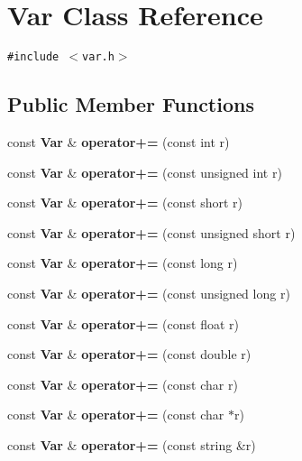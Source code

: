 \section{Var Class Reference}
\label{classVar}
{\tt \#include $<$var.h$>$}

\subsection*{Public Member Functions}
\begin{CompactItemize}
\item 
const {\bf Var} \& \textbf{operator+=} (const int r)\label{classVar_4bb1b12f7b8431c7d36e74216c9d0717}

\item 
const {\bf Var} \& \textbf{operator+=} (const unsigned int r)\label{classVar_12b078f76009965c5d5c80ca806983ef}

\item 
const {\bf Var} \& \textbf{operator+=} (const short r)\label{classVar_31d73e7f641896e16d57e3ef01cd3ea4}

\item 
const {\bf Var} \& \textbf{operator+=} (const unsigned short r)\label{classVar_581eef061e50fe7f0f648b8de5fcb699}

\item 
const {\bf Var} \& \textbf{operator+=} (const long r)\label{classVar_95be0effe332f9e713d59e8bbc604958}

\item 
const {\bf Var} \& \textbf{operator+=} (const unsigned long r)\label{classVar_7862de46a2c0bef16f71bb3e82bf6692}

\item 
const {\bf Var} \& \textbf{operator+=} (const float r)\label{classVar_0035f89e37efb4ae17c12453e44b81b2}

\item 
const {\bf Var} \& \textbf{operator+=} (const double r)\label{classVar_7de3db4816bdd14810b6426504a66c07}

\item 
const {\bf Var} \& \textbf{operator+=} (const char r)\label{classVar_03b89deb763b3c76afa6457ecae5d14b}

\item 
const {\bf Var} \& \textbf{operator+=} (const char $\ast$r)\label{classVar_19ff4000945a208475b604cf21fd23be}

\item 
const {\bf Var} \& \textbf{operator+=} (const string \&r)\label{classVar_543095449a0f529305da7de9df78905d}


\end{CompactItemize}
